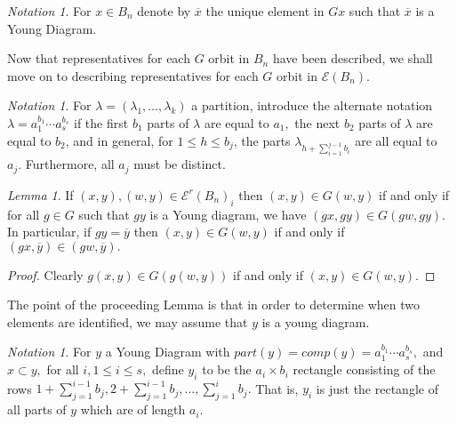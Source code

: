 \documentclass[10 pt]{amsart}
\theoremstyle{plain}
\theoremstyle{definition}
\theoremstyle{remark}
\numberwithin{equation}{section}
\newtheorem{lem}[thm]{Lemma}
\theoremstyle{remark}
\newtheorem{note}[thm]{Notation}
\begin{document}
\begin{note}
For $x \in B_n$ denote by $\overline{x}$ the unique element in $Gx$ such that $\overline{x}$ is a Young Diagram.
\end{note}

Now that representatives for each $G$ orbit in $B_n$ have been described, we shall move on to describing representatives for each $G$ orbit in $\mathcal E(B_n).$

\begin{note}
For $\lambda = (\lambda_1,\ldots, \lambda_k)$ a partition, introduce the alternate notation $\lambda = a_1^{b_1} \cdots a_s^{b_s}$ if the first $b_1$ parts of $\lambda$ are equal to $a_1,$ the next $b_2$ parts of $\lambda$ are equal to $b_2$, and in general, for $1 \leq h\leq b_j$, the parts $ \lambda_{h+\sum_{i=1}^{j-1} b_i}$ are all equal to $a_j.$ Furthermore, all $a_j$ must be distinct.
\end{note}

\begin{lem}
\label{lem:young_diag_reduction}
If $(x, y), (w, y) \in\mathcal E^r(B_n)_i$ then $(x, y) \in G(w, y)$ if and only if for all $g \in G$ such that $gy$ is a Young diagram, we have $(gx, gy) \in G(gw, gy).$ In particular, if $gy = \overline y$ then $(x, y) \in G(w, y)$ if and only if $(gx, \overline y) \in (gw, \overline y).$
\end{lem}
\begin{proof}
Clearly $g(x, y) \in G(g(w, y))$ if and only if $(x, y) \in G(w, y).$
\end{proof}

The point of the proceeding Lemma is that in order to determine when two elements are identified, we may assume that $y$ is a young diagram.

\begin{note}
For $y$ a Young Diagram with $part(y) = comp(y) = a_1^{b_1}\cdots a_s^{b_s},$ and $x \subset y,$ for all $i,1 \leq i \leq s,$ define $y_i$ to be the $a_i \times b_i$ rectangle consisting of the rows $1+\sum_{j = 1}^{i-1} b_j,2+\sum_{j = 1}^{i-1} b_j,\ldots, \sum_{j = 1}^{i} b_j.$ That is, $y_i$ is just the rectangle of all parts of $y$ which are of length $a_i.$
\end{note}
\end{document}
